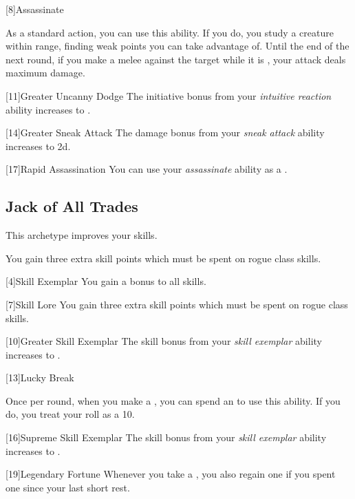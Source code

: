         [8]{Assassinate}
        \begin{ability}
            As a standard action, you can use this ability.
            If you do, you study a creature within \rngmed range, finding weak points you can take advantage of.
            Until the end of the next round, if you make a melee  against the target while it is \unaware, your attack deals maximum damage.
        \end{ability}

        [11]{Greater Uncanny Dodge}
        The initiative bonus from your \textit{intuitive reaction} ability increases to .

        [14]{Greater Sneak Attack}
        The damage bonus from your \textit{sneak attack} ability increases to \plus2d.

        [17]{Rapid Assassination} You can use your \textit{assassinate} ability as a .

    \subsection{Jack of All Trades}
        This archetype improves your skills.

         You gain three extra skill points which must be spent on rogue class skills.

        [4]{Skill Exemplar} You gain a  bonus to all skills.

        [7]{Skill Lore} You gain three extra skill points which must be spent on rogue class skills.

        [10]{Greater Skill Exemplar} The skill bonus from your \textit{skill exemplar} ability increases to .

        [13]{Lucky Break}
        \begin{ability}
            Once per round, when you make a , you can spend an  to use this ability.
            If you do, you treat your roll as a 10.
        \end{ability}

        [16]{Supreme Skill Exemplar} The skill bonus from your \textit{skill exemplar} ability increases to .

        [19]{Legendary Fortune} Whenever you take a , you also regain one  if you spent one since your last short rest.

